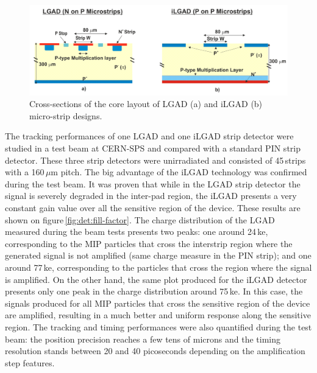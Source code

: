 \begin{figure}[!htbp]
\centering
\includegraphics[width=1.0\hsize]{Detector/fig/cross-section.png}
\caption{Cross-sections of the core layout of LGAD (a) and iLGAD (b) micro-strip designs.}
\label{fig:det:cross-section}
\end{figure}

The tracking performances of one LGAD and one iLGAD strip detector were studied in a test beam at CERN-SPS and compared with a standard PIN strip detector. These three strip detectors were unirradiated and consisted of 45\,strips with a 160\,$\mu$m pitch. 
The big advantage of the iLGAD technology was confirmed during the test beam. It was proven that while in the LGAD strip detector the signal is severely degraded in the inter-pad region, the iLGAD presents a very constant gain value over all the sensitive region of the device. These results are shown on figure\,\ref{fig:det:fill-factor}. The charge distribution of the LGAD measured during the beam tests presents two peaks: one around 24\,ke, corresponding to the MIP particles that cross the interstrip region where the generated signal is not amplified (same charge measure in the PIN strip); and one around 77\,ke, corresponding to the particles that cross the region where the signal is amplified. On the other hand, the same plot produced for the iLGAD detector presents only one peak in the charge distribution around 75\,ke. In this case,  the signals produced for all MIP particles that cross the sensitive region of the device are amplified, resulting in a much better and uniform response along the sensitive region. The tracking and timing performances were also quantified during the test beam: the position precision reaches a few tens of microns and the timing resolution stands between 20 and 40 picoseconds depending on the amplification step features.


